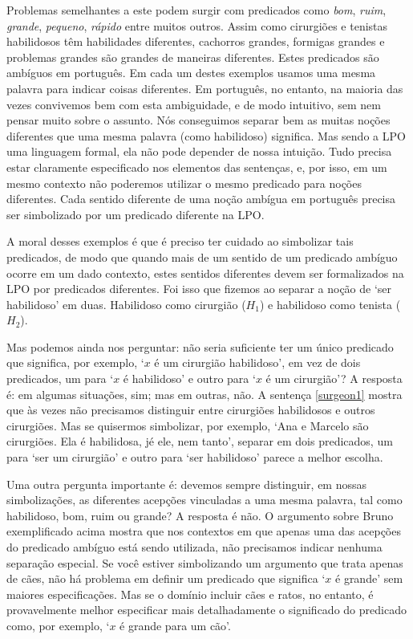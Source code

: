 Problemas semelhantes a este podem surgir com predicados como \emph{bom}, \emph{ruim}, \emph{grande}, \emph{pequeno}, \emph{rápido} entre muitos outros.
Assim como cirurgiões e tenistas habilidosos têm habilidades diferentes, cachorros grandes, formigas grandes e problemas grandes são grandes de maneiras diferentes.
Estes predicados são ambíguos em português.
Em cada um destes exemplos usamos uma mesma palavra para indicar coisas diferentes.
Em português, no entanto, na maioria das vezes convivemos bem com esta ambiguidade, e de modo intuitivo, sem nem pensar muito sobre o assunto.
Nós conseguimos separar bem as muitas noções diferentes que uma mesma palavra (como habilidoso) significa.
Mas sendo a LPO uma linguagem formal, ela não pode depender de nossa intuição.
Tudo precisa estar claramente especificado nos elementos das sentenças, e, por isso, em um mesmo contexto não poderemos utilizar o mesmo predicado para noções diferentes.
Cada sentido diferente de uma noção ambígua em português precisa ser simbolizado por um predicado diferente na LPO.

A moral desses exemplos é que é preciso ter cuidado ao simbolizar tais predicados, de modo que quando mais de um sentido de um predicado ambíguo ocorre em um dado contexto, estes sentidos diferentes devem ser formalizados na LPO por predicados diferentes.
Foi isso que fizemos ao separar a noção de `ser habilidoso' em duas. Habilidoso como cirurgião ($H_1$) e habilidoso como tenista ($H_2$). 

Mas podemos ainda nos perguntar: não seria suficiente ter um único predicado que significa, por exemplo, `$x$ é um cirurgião habilidoso', em vez de dois predicados, um para  `$x$ é habilidoso' e outro para  `$x$ é um cirurgião'?
A resposta é: em algumas situações, sim; mas em outras, não.
A sentença \ref{surgeon1} mostra que às vezes não precisamos distinguir entre cirurgiões habilidosos e outros cirurgiões.
Mas se quisermos simbolizar, por exemplo, `Ana e Marcelo são cirurgiões. Ela é habilidosa, jé ele, nem tanto', separar em dois predicados, um para `ser um cirurgião' e outro para `ser habilidoso' parece a melhor escolha.

Uma outra pergunta importante é: devemos sempre distinguir, em nossas simbolizações, as diferentes  acepções vinculadas a uma mesma palavra, tal como habilidoso, bom, ruim ou grande?
A resposta é não. O argumento sobre Bruno exemplificado acima mostra que nos contextos em que apenas uma das acepções do predicado ambíguo está sendo utilizada, não precisamos indicar nenhuma separação especial.
Se você estiver simbolizando um argumento que trata apenas de cães, não há problema em definir um predicado que significa `$x$ é grande' sem maiores especificações.
Mas se o domínio incluir cães e ratos, no entanto, é provavelmente melhor especificar mais detalhadamente o significado do predicado como, por exemplo, `$x$ é grande para um cão'.


